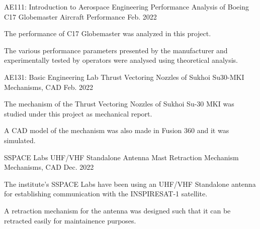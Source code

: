 

\begin{cventries}

  \cventry
  {AE111: Introduction to Aerospace Engineering} %
  {Performance Analysis of Boeing C17 Globemaster} %
  {Aircraft Performance} %
  {Feb. 2022} %
  {
    \begin{cvitems} %
      \item {The performance of C17 Globemaster was analyzed in this project.}
      \item {The various performance parameters presented by the manufacturer and experimentally tested by operators were analysed using theoretical analysis.}
    \end{cvitems}
  }

  \cventry
  {AE131: Basic Engineering Lab} %
  {Thrust Vectoring Nozzles of Sukhoi Su30-MKI} %
  {Mechanisms, CAD} %
  {Feb. 2022} %
  {
    \begin{cvitems} %
      \item {The mechanism of the Thrust Vectoring Nozzles of Sukhoi Su-30 MKI was studied under this project as mechanical report.}
      \item { A CAD model of the mechanism was also made in Fusion 360 and it was simulated.}
    \end{cvitems}
  }

  \cventry
  {SSPACE Labs} %
  {UHF/VHF Standalone Antenna Mast Retraction Mechanism} %
  {Mechanisms, CAD} %
  {Dec. 2022} %
  {
    \begin{cvitems} %
      \item {The institute's SSPACE Labs have been using an UHF/VHF Standalone antenna for establishing communication with the INSPIRESAT-1 satellite.}
      \item {A retraction mechanism for the antenna was designed such that it can be retracted easily for maintainence purposes.}
    \end{cvitems}
  }


\end{cventries}
